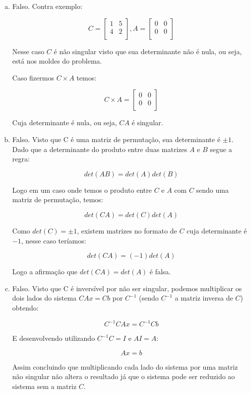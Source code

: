 \documentclass[11pt]{article}
\begin{document}
\begin{exerc}
\begin{enumerate}[a.]
\item
Falso. Contra exemplo:

$$C =
\begin{bmatrix}
	1 & 5\\
	4 & 2\\
\end{bmatrix}
,
A = 
\begin{bmatrix}
	0 & 0\\
	0 & 0\\
\end{bmatrix}
$$

Nesse caso $C$ é não singular visto que sua determinante não é nula, ou seja, está nos moldes do problema.

Caso fizermos $C \times A$ temos:

$$C \times A =
\begin{bmatrix}
	0 & 0\\
	0 & 0\\
\end{bmatrix}$$

Cuja determinante é nula, ou seja, $CA$ é singular.

\item
Falso. Visto que C é uma matriz de permutação, sua determinante é $\pm1$. Dado que a determinante do produto entre duas matrizes $A$ e $B$ segue a regra:

$$det(AB) = det(A) det(B)$$

Logo em um caso onde temos o produto entre $C$ e $A$ com $C$ sendo uma matriz de permutação, temos:

$$det(CA) = det(C) det(A)$$

Como $det(C) = \pm1$, existem matrizes no formato de $C$ cuja determinante é $-1$, nesse caso teríamos:

$$det(CA) = (-1) det(A)$$

Logo a afirmação que $det(CA) = det(A)$ é falsa.

\item
Falso. Visto que C é inversível por não ser singular, podemos multiplicar os dois lados do sistema $CAx = Cb$ por $C^{-1}$ (sendo $C^{-1}$ a matriz inversa de $C$) obtendo:

$$C^{-1}CAx = C^{-1}Cb$$

E desenvolvendo utilizando $C^{-1}C = I$ e $AI = A$:

$$Ax = b$$

Assim concluindo que multiplicando cada lado do sistema por uma matriz não singular não altera o resultado já que o sistema pode ser reduzido ao sistema sem a matriz $C$.

\end{enumerate}
\end{exerc}
\end{document}
